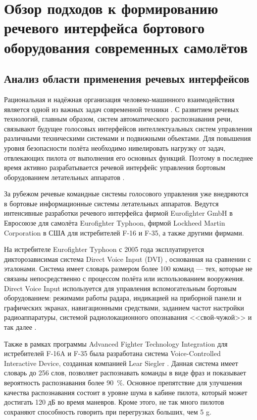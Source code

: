 \chapter{Обзор подходов к формированию речевого интерфейса бортового оборудования современных самолётов} \label{chapt1}

\section{Анализ области применения речевых интерфейсов} \label{sect1_1}

Рациональная и надёжная организация человеко-машинного взаимодействия является одной из важных задач современной техники \cite{evdokimenkov2015use, polyak2017principle, kolokolov2006obrabotka, sebryakov2007problems}.
С развитием речевых технологий, главным образом, систем автоматического распознавания речи, связывают будущее голосовых интерфейсов интеллектуальных систем управления различными техническими системами и подвижными объектами.
Для повышения уровня безопасности полёта необходимо нивелировать нагрузку от задач, отвлекающих пилота от выполнения его основных функций.
Поэтому в последнее время активно разрабатывается речевой интерфейс управления бортовым оборудованием летательных аппаратов \cite{bandaros2007sistema, bandaros2009issledovanie, korsun2011synthesis, evdokimenkov2015use}.

За рубежом речевые командные системы голосового управления уже внедряются в бортовые информационные системы летательных аппаратов.
Ведутся интенсивные разработки речевого интерфейса фирмой Eurofighter GmbH в Евросоюзе для самолёта Eurofighter Typhoon, фирмой Lockheed Martin Corporation в США для истребителей F-16 и F-35, а также другими фирмами.

На истребителе Eurofighter Typhoon с 2005 года эксплуатируется дикторозависимая система Direct Voice Input (DVI) \cite{eurofighter2005}, основанная на сравнении с эталонами.
Система имеет словарь размером более 100 команд --- тех, которые не связаны непосредственно с процессом полёта или использованием вооружения.
Direct Voice Input используется для управления вспомогательным бортовым оборудованием: режимами работы радара, индикацией на приборной панели и графических экранах, навигационными средствами, заданием частот настройки радиоаппаратуры, системой радиолокационного опознавания <<свой-чужой>> и так далее \cite{eurofighter2016}.

Также в рамках программы Advanced Fighter Technology Integration для истребителей F-16A и F-35 была разработана система Voice-Controlled Interactive Device, созданная компанией Lear Siegler \cite{f16vcid}.
Данная система имеет словарь до 256 слов, позволяет распознавать команды в виде фраз и показывает вероятность распознавания более 90~\%.
Основное препятствие для улучшения качества распознавания состоит в уровне шума в кабине пилота, который может достигать 120 дБ во время маневров.
Кроме этого, не так много пилотов сохраняют способность говорить при перегрузках больших, чем 5 g.

